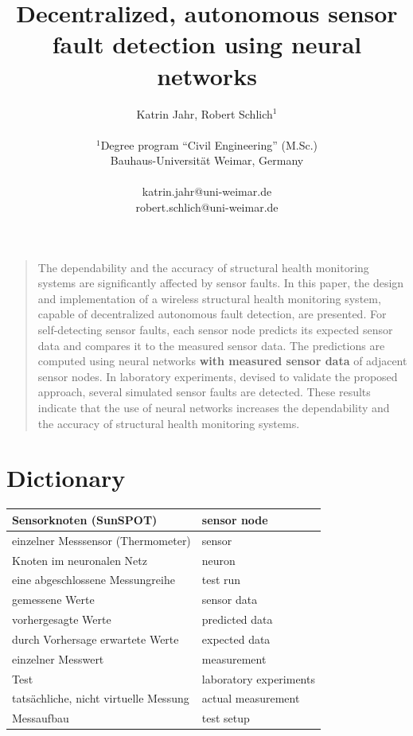 \documentclass[12pt,a4paper]{scrartcl}
\title{\textbf{ \Large{Decentralized, autonomous sensor fault detection using neural networks}} }
\author
{Katrin Jahr, Robert Schlich$^{1}$\\
\\
\normalsize{$^{1}$Degree program “Civil Engineering” (M.Sc.)}\\
\normalsize{Bauhaus-Universität Weimar, Germany}\\
\\
\normalsize{katrin.jahr@uni-weimar.de}\\
\normalsize{robert.schlich@uni-weimar.de}
}
\date{}
\newenvironment{sciabstract}{%
\begin{quote} \bfseries}
{\end{quote}}
\begin{document}
 


\baselineskip32pt


\maketitle 




\begin{sciabstract}

The dependability and the accuracy of structural health monitoring systems are significantly affected by sensor faults. 
In this paper, the design and implementation of a wireless structural health monitoring system, capable of decentralized autonomous fault detection, are presented. 
For self-detecting sensor faults, each sensor node predicts its expected sensor data and compares it to the measured sensor data. 
The predictions are computed using neural networks \textbf{with measured sensor data} of adjacent sensor nodes.
In laboratory experiments, devised to validate the proposed approach, several simulated sensor faults are detected.
These results indicate that the use of neural networks increases the dependability and the accuracy of structural health monitoring systems.

\end{sciabstract}


\section*{Dictionary}

\begin{tabular}{|l|l|}
\hline 
Sensorknoten (SunSPOT) & sensor node \\ 
\hline 
einzelner Messsensor (Thermometer) & sensor \\ 
\hline 
Knoten im neuronalen Netz & neuron \\ 
\hline 
eine abgeschlossene Messungreihe & test run \\ 
\hline 
gemessene Werte & sensor data \\ 
\hline 
vorhergesagte Werte & predicted data \\ 
\hline 
durch Vorhersage erwartete Werte & expected data \\ 
\hline 
einzelner Messwert & measurement \\ 
\hline 
Test & laboratory experiments\\ 
\hline
tatsächliche, nicht virtuelle Messung & actual measurement \\
\hline
Messaufbau & test setup \\
\hline

\end{tabular} 
\end{document}
